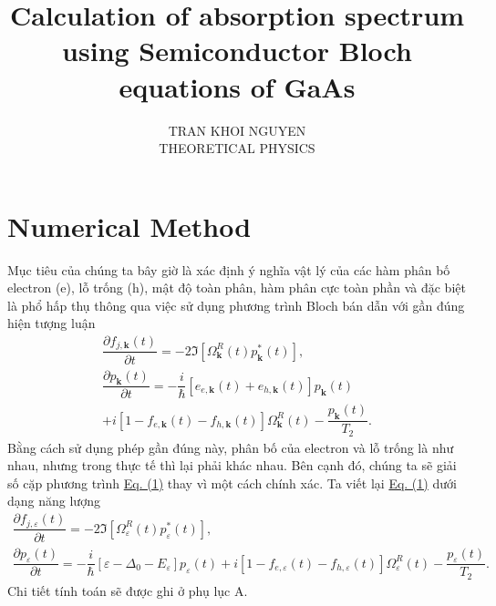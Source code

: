 \documentclass{article}
\title{\Huge{Calculation of absorption spectrum using Semiconductor Bloch equations of GaAs}}
\newcommand{\f}[2]{\dfrac{#1}{#2}}
\begin{document}
\setlength{\parindent}{20pt}
\newpage
\author{TRAN KHOI NGUYEN \\ THEORETICAL PHYSICS}
\maketitle
\section{Numerical Method}
Mục tiêu của chúng ta bây giờ là xác định ý nghĩa vật lý của các hàm phân bố electron (e), lỗ trống (h), mật độ toàn phân, hàm phân cực toàn phần và đặc biệt là phổ hấp thụ thông qua việc sử dụng phương trình Bloch bán dẫn với gần đúng hiện tượng luận
\begin{equation}
	\begin{aligned}
		\f{\partial f_{j,\mathbf{k}} (t)}{\partial t} = - 2 \Im \left[ \Omega_{\mathbf{k}}^{R}(t) p^{*}_{\mathbf{k}}(t)\right], \label{Eq:1}\\
		\f{\partial p_{\mathbf{k}}(t)}{\partial t} = - \f{i}{\hbar} \left[ e_{e,\mathbf{k}}(t) + e_{h,\mathbf{k}}(t)  \right] p_{\mathbf{k}}(t) \\
		+ i \left[ 1 - f_{e,\mathbf{k}}(t) - f_{h,\mathbf{k}}(t) \right] \Omega_{\mathbf{k}}^{R}(t) - \f{p_{\mathbf{k}}(t)}{T_{2}}. 
	\end{aligned}
\end{equation}
Bằng cách sử dụng phép gần đúng này, phân bố của electron và lỗ trống là như nhau, nhưng trong thực tế thì lại phải khác nhau. Bên cạnh đó, chúng ta sẽ giải số cặp phương trình \hyperref[Eq:1]{Eq. (1)} thay vì một cách chính xác. Ta viết lại \hyperref[Eq:1]{Eq. (1)} dưới dạng năng lượng
\begin{gather}
	\f{\partial f_{j,\varepsilon} (t)}{\partial t} = - 2 \Im \left[ \Omega_{\varepsilon}^{R}(t) p^{*}_{\varepsilon}(t)\right], \label{Eq:2}\\
	\f{\partial p_{\varepsilon}(t)}{\partial t} = - \f{i}{\hbar} \left[ \varepsilon - \Delta_{0} - E_{\varepsilon}  \right] p_{\varepsilon}(t)
	+ i \left[ 1 - f_{e,\varepsilon}(t) - f_{h,\varepsilon}(t) \right] \Omega_{\varepsilon}^{R}(t) - \f{p_{\varepsilon}(t)}{T_{2}}. \label{Eq:3}
\end{gather}
Chi tiết tính toán sẽ được ghi ở phụ lục A.
\end{document}
